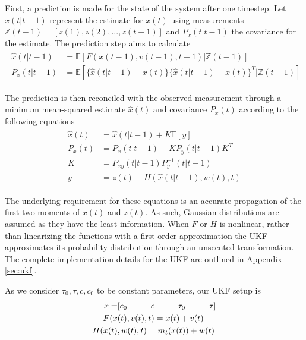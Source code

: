 First, a prediction is made for the state of the system after one timestep. Let $\hat{x}(t\vert t-1)$ represent the estimate for $x(t)$ using measurements $\mathbb{Z}(t-1)=[z(1), z(2), ..., z(t-1)]$ and $P_{x}(t\vert t-1)$ the covariance for the estimate. The prediction step aims to calculate
\begin{align}\begin{split}
  \hat{x}(t\vert t-1) &= \mathbb{E}[F(x(t-1), v(t-1), t-1)\vert \mathbb{Z}(t-1)]\\
  P_{x}(t\vert t-1) &= \mathbb{E}[\{ \hat{x}(t\vert t-1) - x(t) \} \{ \hat{x}(t\vert t-1) - x(t) \}^T \vert \mathbb{Z}(t-1)]
\end{split}\end{align}

The prediction is then reconciled with the observed measurement through a minimum mean-squared estimate $\hat{x}(t)$ and covariance $P_{x}(t)$ according to the following equations
\begin{align}
\begin{split}
  \hat{x}(t) &= \hat{x}(t\vert t-1) + K \mathbb{E}[y] \\
  P_{x}(t) &= P_{x}(t\vert t-1) - KP_{y}(t\vert t-1) K^T\\
  K &= P_{xy}(t\vert t-1) P_{y}^{-1}(t\vert t-1)\\
  y &= z(t) - H(\hat{x}(t\vert t-1) , w(t), t)
\end{split}
\end{align}

The underlying requirement for these equations is an accurate propagation of the first two moments of $x(t)$ and $z(t)$. As such, Gaussian distributions are assumed as they have the least information. When $F$ or $H$ is nonlinear, rather than linearizing the functions with a first order approximation the UKF approximates its probability distribution through an unscented transformation. The complete implementation details for the UKF are outlined in Appendix \ref{sec:ukf}.

As we consider $\tau_0, \tau, c, c_0$ to be constant parameters, our UKF setup is
\begin{align}
\begin{split}
  x = &[c_0 \hspace*{1cm} c \hspace*{1cm} \tau_0 \hspace*{1cm} \tau]\\
  F(x&(t), v(t), t) = x(t) + v(t)\\
  H(x(t)&, w(t), t) = m_t(x(t)) + w(t)
\end{split}
\end{align}

